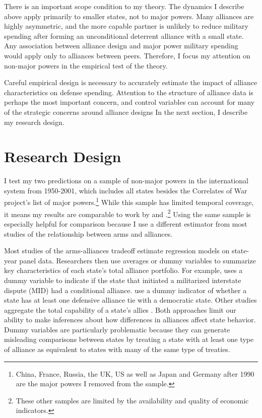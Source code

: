 \documentclass[12pt]{article}
\begin{document}
There is an important scope condition to my theory. The dynamics I describe above apply primarily to smaller states, not to major powers. Many alliances are highly asymmetric, and the more capable partner is unlikely to reduce military spending after forming an unconditional deterrent alliance with a small state. Any association between alliance design and major power military spending would apply only to alliances between peers. Therefore, I focus my attention on non-major powers in the empirical test of the theory. 

Careful empirical design is necessary to accurately estimate the impact of alliance characteristics on defense spending. Attention to the structure of alliance data is perhaps the most important concern, and control variables can account for many of the strategic concerns around alliance designs In the next section, I describe my research design. 
 

\section*{Research Design} 

I test my two predictions on a sample of non-major powers in the international system from 1950-2001, which includes all states besides the Correlates of War project's list of major powers.\footnote{China, France, Russia, the UK, US as well as Japan and Germany after 1990 are the major powers I removed from the sample.} While this sample has limited temporal coverage, it means my results are comparable to work by \citet{DigiuseppePoast2016} and \citet{Nordhausetal2012}.\footnote{These other samples are limited by the availability and quality of economic indicators.} Using the same sample is especially helpful for comparison because I use a different estimator from most studies of the relationship between arms and alliances. 

Most studies of the arms-alliances tradeoff estimate regression models on state-year panel data. Researchers then use averages or dummy variables to summarize key characteristics of each state's total alliance portfolio. For example, \citet{Benson2012} uses a dummy variable to indicate if the state that initiated a militarized interstate dispute (MID) had a conditional alliance. \citet{DigiuseppePoast2016} use a dummy indicator of whether a state has at least one defensive alliance tie with a democratic state. Other studies aggregate the total capability of a state's allies \citep{Nordhausetal2012}. Both approaches limit our ability to make inferences about how differences in alliances affect state behavior. Dummy variables are particularly problematic because they can generate misleading comparisons between states by treating a state with at least one type of alliance as equivalent to states with many of the same type of treaties. 
\end{document}
